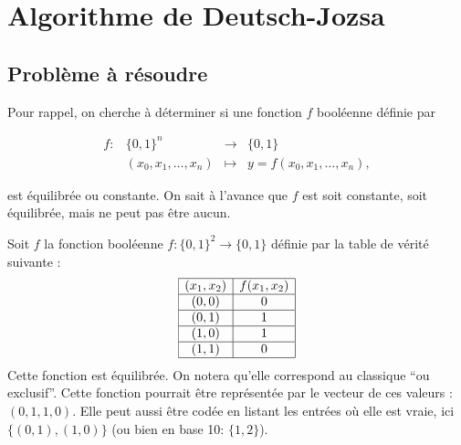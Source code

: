 

\chapter{Algorithme de Deutsch-Jozsa}
\label{appendix:DJ}
\section{Problème à résoudre}

Pour rappel, on cherche à déterminer si une fonction $f$ booléenne définie par

\[
  \begin{array}{llll}
    f :  &  \{0, 1\}^n              & \to       & \{ 0, 1 \} \\
         &  (x_0, x_1, \dots , x_n) & \mapsto   &  y = f(x_0, x_1, \dots , x_n), 
  \end{array}  
\]

est équilibrée ou constante. On sait à l'avance que $f$ est soit constante, soit équilibrée, mais ne peut pas être aucun.





\begin{ex}
  Soit $f$ la fonction booléenne $f : \{0,1\}^2 \to \{0,1\}$ définie
  par la table de vérité suivante :
\[
  \begin{array}{|c|c|}
    \hline
   (x_1, x_2) & f(x_1,x_2) \\
    \hline
    (0,0) & 0 \\
    \hline
    (0,1) & 1 \\
    \hline
    (1,0) & 1 \\
    \hline
    (1,1) & 0 \\
    \hline
  \end{array}
\]
Cette fonction est équilibrée. On notera qu'elle correspond au
classique ``ou exclusif''. Cette fonction pourrait être représentée
par le vecteur de ces valeurs : $(0,1,1,0)$. Elle peut aussi être
codée en listant les entrées où elle est vraie, ici $\{(0,1),(1,0)\}$ (ou bien en base 10: $\{1, 2\}$).
\end{ex}

